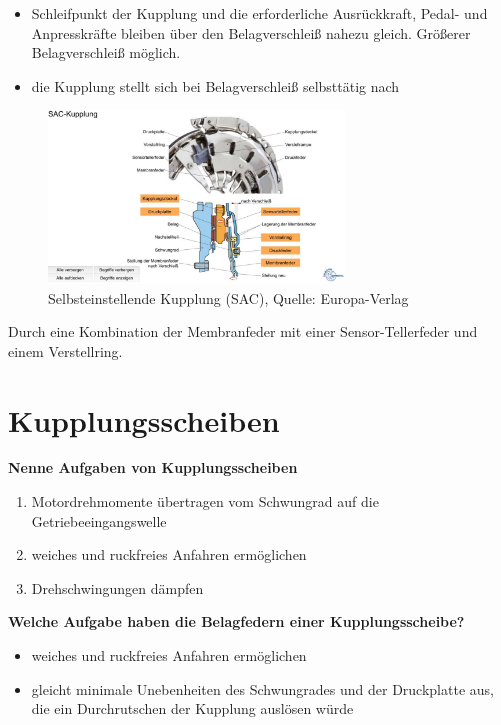 \begin{itemize}
\item
  Schleifpunkt der Kupplung und die erforderliche Ausrückkraft, Pedal-
  und Anpresskräfte bleiben über den Belagverschleiß nahezu gleich.
  Größerer Belagverschleiß möglich.
\item
  die Kupplung stellt sich bei Belagverschleiß selbsttätig nach
\end{itemize}

\begin{figure}[!ht]%
\centering
\includegraphics[width=0.7\textwidth]{images/Kupplung/Kupplung-7.pdf}
\caption{Selbsteinstellende Kupplung (SAC), Quelle: Europa-Verlag}
\end{figure}

Durch eine Kombination der Membranfeder mit einer Sensor-Tellerfeder und
einem Verstellring.

\section{Kupplungsscheiben}\label{kupplungsscheiben}

\textbf{Nenne Aufgaben von Kupplungsscheiben}

\begin{enumerate}
\item
  Motordrehmomente übertragen vom Schwungrad auf die
  Getriebeeingangswelle
\item
  weiches und ruckfreies Anfahren ermöglichen
\item
  Drehschwingungen dämpfen
\end{enumerate}

\textbf{Welche Aufgabe haben die Belagfedern einer Kupplungsscheibe?}

\begin{itemize}
\item
  weiches und ruckfreies Anfahren ermöglichen
\item
  gleicht minimale Unebenheiten des Schwungrades und der Druckplatte
  aus, die ein Durchrutschen der Kupplung auslösen würde
\end{itemize}

